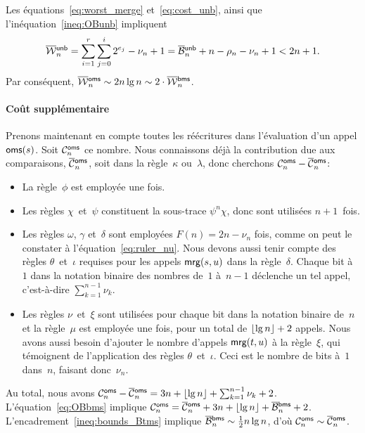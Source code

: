 Les équations~\eqref{eq:worst_merge} et~\eqref{eq:cost_unb}, ainsi que
l'inéquation~\eqref{ineq:OBunb} impliquent
\begin{equation*}
\OW{\fun{unb}}{n} = \sum_{i=1}^{r}\sum_{j=0}^{i}{2^{e_j}} - \nu_n + 1
                  = \OB{\fun{unb}}{n} + n - \rho_n - \nu_n + 1
                  < 2n + 1.
\end{equation*}
Par conséquent, \(\OW{\fun{oms}}{n} \sim 2n\lg n \sim 2
\cdot \OW{\fun{bms}}{n}\).

\paragraph{Coût supplémentaire}

Prenons maintenant en compte toutes les réécritures dans l'évaluation
d'un appel \(\fun{oms}(s)\). Soit
\(\C{\fun{oms}}{n}\) ce nombre. Nous
connaissons déjà la contribution due aux comparaisons,
\(\OC{\fun{oms}}{n}\), soit dans la
règle~\(\kappa\) ou~\(\lambda\), donc cherchons \(\C{\fun{oms}}{n} -
\OC{\fun{oms}}{n}\):
\begin{itemize}

  \item La règle~\(\phi\) est employée une fois.

  \item Les règles \(\chi\)~et~\(\psi\) constituent la sous-trace
    \(\psi^n\chi\), donc sont utilisées \(n+1\)~fois.

  \item Les règles \(\omega\), \(\gamma\) et~\(\delta\) sont employées
    \(F(n) = 2n - \nu_n\) fois, comme on peut le constater à
    l'équation~\eqref{eq:ruler_nu}. Nous devons aussi tenir compte des
    règles \(\theta\)~et~\(\iota\) requises pour les appels
    \(\fun{mrg}(s,u)\) dans la règle~\(\delta\). Chaque bit à~\(1\)
    dans la notation binaire des nombres de~\(1\) à~\(n-1\) déclenche
    un tel appel, c'est-à-dire \(\sum_{k=1}^{n-1}\nu_k\).

  \item Les règles \(\nu\)~et~\(\xi\) sont utilisées pour chaque bit
    dans la notation binaire de~\(n\) et la règle~\(\mu\) est employée
    une fois, pour un total de \(\floor{\lg n} + 2\) appels. Nous
    avons aussi besoin d'ajouter le nombre d'appels
    \(\fun{mrg}(t,u)\) à la règle~\(\xi\), qui
    témoignent de l'application des règles
    \(\theta\)~et~\(\iota\). Ceci est le nombre de bits à~\(1\)
    dans~\(n\), faisant donc~\(\nu_n\).

\end{itemize}
Au total, nous avons \(\C{\fun{oms}}{n} - \OC{\fun{oms}}{n} = 3n +
\floor{\lg n} + \sum_{k=1}^{n-1}\nu_k +
2\). L'équation~\eqref{eq:OBbms}  implique
\(\C{\fun{oms}}{n} = \OC{\fun{oms}}{n} + 3n + \floor{\lg n} +
\OB{\fun{bms}}{n} + 2\). L'encadrement~\eqref{ineq:bounds_Btms}
 implique \(\OB{\fun{bms}}{n} \sim
\tfrac{1}{2}n\lg n\), d'où \(\C{\fun{oms}}{n} \sim
\OC{\fun{oms}}{n}\).   

